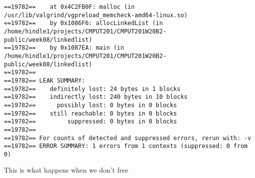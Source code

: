 \documentclass[11pt]{article}
\begin{document}
\begin{verbatim}
==19782==    at 0x4C2FB0F: malloc (in /usr/lib/valgrind/vgpreload_memcheck-amd64-linux.so)
==19782==    by 0x1086F6: allocLinkedList (in /home/hindle1/projects/CMPUT201/CMPUT201W20B2-public/week08/linkedlist)
==19782==    by 0x1087EA: main (in /home/hindle1/projects/CMPUT201/CMPUT201W20B2-public/week08/linkedlist)
==19782== 
==19782== LEAK SUMMARY:
==19782==    definitely lost: 24 bytes in 1 blocks
==19782==    indirectly lost: 240 bytes in 10 blocks
==19782==      possibly lost: 0 bytes in 0 blocks
==19782==    still reachable: 0 bytes in 0 blocks
==19782==         suppressed: 0 bytes in 0 blocks
==19782== 
==19782== For counts of detected and suppressed errors, rerun with: -v
==19782== ERROR SUMMARY: 1 errors from 1 contexts (suppressed: 0 from 0)
\end{verbatim}






This is what happens when we don't free
\end{document}
